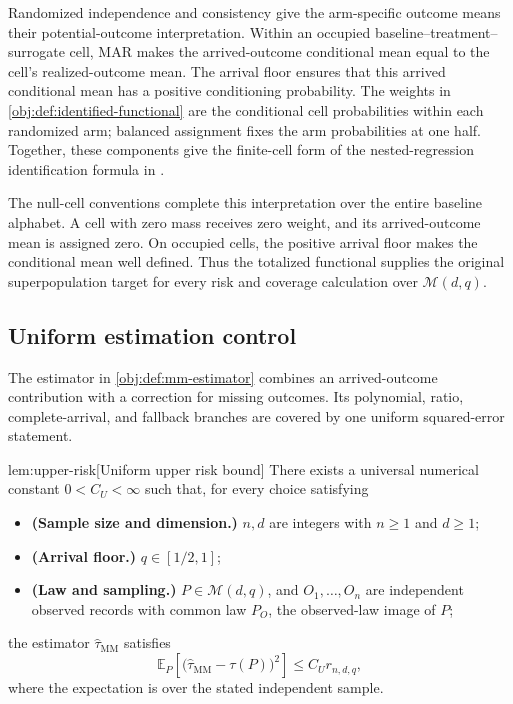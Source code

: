 \documentclass[11pt]{article}
\begin{document}
Randomized independence and consistency give the arm-specific outcome means their potential-outcome interpretation. Within an occupied baseline--treatment--surrogate cell, MAR makes the arrived-outcome conditional mean equal to the cell's realized-outcome mean. The arrival floor ensures that this arrived conditional mean has a positive conditioning probability. The weights in \cref{obj:def:identified-functional} are the conditional cell probabilities within each randomized arm; balanced assignment fixes the arm probabilities at one half. Together, these components give the finite-cell form of the nested-regression identification formula in \citet[Lemma~1.1, equation~(10), under Assumptions~1--3]{KallusMao2025}.

The null-cell conventions complete this interpretation over the entire baseline alphabet. A cell with zero mass receives zero weight, and its arrived-outcome mean is assigned zero. On occupied cells, the positive arrival floor makes the conditional mean well defined. Thus the totalized functional supplies the original superpopulation target for every risk and coverage calculation over \(\mathcal M(d,q)\).

\subsection{Uniform estimation control}

The estimator in \cref{obj:def:mm-estimator} combines an arrived-outcome contribution with a correction for missing outcomes. Its polynomial, ratio, complete-arrival, and fallback branches are covered by one uniform squared-error statement.

\begin{lemmav}{lem:upper-risk}[Uniform upper risk bound]
There exists a universal numerical constant \(0<C_U<\infty\) such that, for every choice satisfying
\begin{itemize}
\item \textbf{(Sample size and dimension.)} \(n,d\) are integers with \(n\ge1\) and \(d\ge1\);
\item \textbf{(Arrival floor.)} \(q\in[1/2,1]\);
\item \textbf{(Law and sampling.)} \(P\in\mathcal M(d,q)\), and \(O_1,\ldots,O_n\) are independent observed records with common law \(P_O\), the observed-law image of \(P\);
\end{itemize}
the estimator \(\widehat\tau_{\mathrm{MM}}\) satisfies
\[
\mathbb E_P\!\left[
  \bigl(\widehat\tau_{\mathrm{MM}}-\tau(P)\bigr)^2
\right]
\le C_U r_{n,d,q},
\]
where the expectation is over the stated independent sample.
\end{lemmav}
\end{document}
